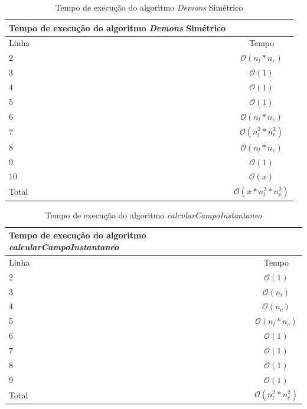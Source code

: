 \begin{table}[H]
\begin{center}
\begin{tabular}{l|c}
\hline
Tempo de execução do algoritmo \textit{Demons} Simétrico \\
\hline
Linha&Tempo\\
\hline
2       &$\mathcal{O}(n_l*n_c)$ \\
3       &$\mathcal{O}(1)$\\
4       &$\mathcal{O}(1)$\\
5       &$\mathcal{O}(1)$\\
6       &$\mathcal{O}(n_l*n_c)$\\
7       &$\mathcal{O}(n_l^2*n_c^2)$\\
8       &$\mathcal{O}(n_l*n_c)$\\
9       &$\mathcal{O}(1)$\\
10       &$\mathcal{O}(x)$\\
\hline
Total   &$\mathcal{O}(x*n_l^2*n_c^2)$\\
\hline
\end{tabular}
\caption{Tempo de execução do algoritmo \textit{Demons} Simétrico}
\label{table:tps}
\end{center}
\end{table}

\begin{table}[H]
\begin{center}
\begin{tabular}{l|c}
\hline
Tempo de execução do algoritmo \textit{calcularCampoInstantaneo} \\
\hline
Linha&Tempo\\
\hline
2       &$\mathcal{O}(1)$ \\
3       &$\mathcal{O}(n_l)$ \\
4       &$\mathcal{O}(n_c)$\\
5       &$\mathcal{O}(n_l*n_c)$\\
6       &$\mathcal{O}(1)$\\
7       &$\mathcal{O}(1)$\\
8       &$\mathcal{O}(1)$\\
9       &$\mathcal{O}(1)$\\
\hline
Total   &$\mathcal{O}(n_l^2*n_c^2)$\\
\hline
\end{tabular}
\caption{Tempo de execução do algoritmo \textit{calcularCampoInstantaneo}}
\label{table:interpolar}
\end{center}
\end{table}

